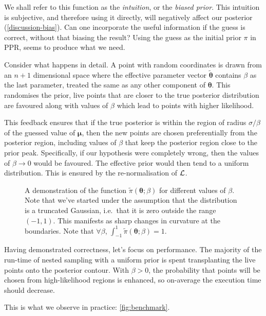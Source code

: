 \documentclass[usenatbib]{mnras}
\begin{document}
We shall refer to this function as the \emph{intuition}, or the \emph{biased
prior}. This intuition is subjective, and therefore using it
directly, will negatively affect our posterior (\vref{discussion-bias}). Can one incorporate the useful
information if the guess is correct, without that biasing the
result? Using the guess as the initial prior \(\pi\) in PPR, seems to
produce what we need.

Consider what happens in detail. A point with random coordinates is
drawn from an \(n+1\) dimensional space where the effective
parameter vector \(\tilde{\bm{\theta}}\) contains \(\beta\) as
the last parameter, treated the same as any other component of
\(\bm{\theta}\). This randomises the prior, live points that are closer to
the true posterior distribution are favoured along with values of
\(\beta\) which lead to points with higher likelihood.  

This feedback ensures that if the true posterior is within the
region of radius \(\sigma / \beta\) of the guessed value of
\(\bm{\mu}\), then the new points are chosen preferentially from the
posterior region, including values of \(\beta\) that keep the
posterior region close to the prior peak. Specifically, if our
hypothesis were completely wrong, then the values of \(\beta
   \rightarrow 0\) would be favoured. The effective prior would then
tend to a uniform distribution. This is ensured by the
re-normalisation of \({\cal L}\).

\begin{figure}
 
\caption{\label{org44950de}
A demonstration of the function \(\tilde{\pi}(\bm{\theta}; \beta)\) for different values of \(\beta\). Note that we've started under the assumption that the distribution is a truncated Gaussian, i.e.~that it is zero outside the range \((-1, 1)\). This manifests as sharp changes in curvature at the boundaries. Note that \(\forall \beta\), \(\int_{-1}^{1}\tilde{\pi}(\bm{\theta}; \beta) = 1\).}
\end{figure}

Having demonstrated correctness, let's focus on performance. The
majority of the run-time of nested sampling with a uniform prior is
spent transplanting the live points onto the posterior
contour. With \(\beta>0\), the probability that points will be chosen
from high-likelihood regions is enhanced, so on-average the
execution time should decrease.

This is what we observe in practice: \cref{fig:benchmark}. 
\end{document}
